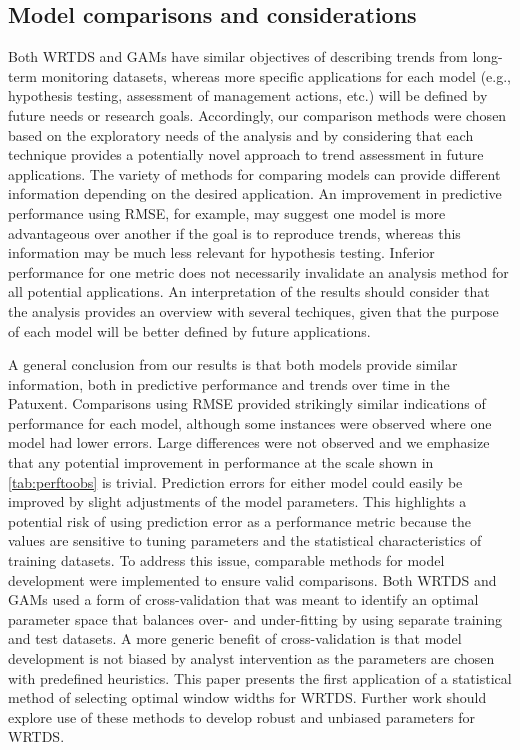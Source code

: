 \documentclass[letterpaper,12pt,oneside]{article}\usepackage[]{graphicx}\usepackage[]{color}
\begin{document}
\subsection*{Model comparisons and considerations}

Both \ac{WRTDS} and \acp{GAM} have similar objectives of describing trends from long-term monitoring datasets, whereas more specific applications for each model (e.g., hypothesis testing, assessment of management actions, etc.) will be defined by future needs or research goals.  Accordingly, our comparison methods were chosen based on the exploratory needs of the analysis and by considering that each technique provides a potentially novel approach to trend assessment in future applications.  The variety of methods for comparing models can provide different information depending on the desired application.  An improvement in predictive performance using \ac{RMSE}, for example, may suggest one model is more advantageous over another if the goal is to reproduce trends, whereas this information may be much less relevant for hypothesis testing. Inferior performance for one metric does not necessarily invalidate an analysis method for all potential applications.  An interpretation of the results should consider that the analysis provides an overview with several techiques, given that the purpose of each model will be better defined by future applications. 

A general conclusion from our results is that both models provide similar information, both in predictive performance and trends over time in the Patuxent.  Comparisons using \ac{RMSE} provided strikingly similar indications of performance for each model, although some instances were observed where one model had lower errors.  Large differences were not observed and we emphasize that any potential improvement in performance at the scale shown in \cref{tab:perftoobs} is trivial.  Prediction errors for either model could easily be improved by slight adjustments of the model parameters.  This highlights a potential risk of using prediction error as a performance metric because the values are sensitive to tuning parameters and the statistical characteristics of training datasets. To address this issue, comparable methods for model development were implemented to ensure valid comparisons.  Both \ac{WRTDS} and \acp{GAM} used a form of cross-validation that was meant to identify an optimal parameter space that balances over- and under-fitting by using separate training and test datasets.  A more generic benefit of cross-validation is that model development is not biased by analyst intervention as the parameters are chosen with predefined heuristics.  This paper presents the first application of a statistical method of selecting optimal window widths for \ac{WRTDS}.  Further work should explore use of these methods to develop robust and unbiased parameters for \ac{WRTDS}. 
  
\end{document}
